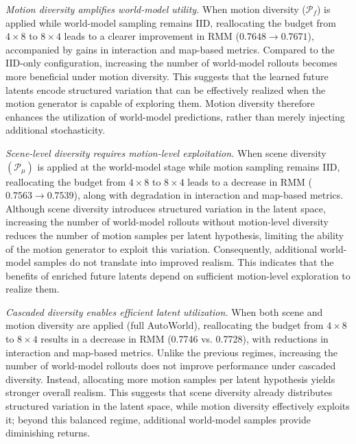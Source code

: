 \documentclass[runningheads]{llncs}
\begin{document}
\textit{Motion diversity amplifies world-model utility.} When motion diversity ($\mathcal{P}_f$) is applied while world-model sampling remains IID, reallocating the budget from $4 \times 8$ to $8 \times 4$ leads to a clearer improvement in RMM ($0.7648 \rightarrow 0.7671$), accompanied by gains in interaction and map-based metrics. Compared to the IID-only configuration, increasing the number of world-model rollouts becomes more beneficial under motion diversity. This suggests that the learned future latents encode structured variation that can be effectively realized when the motion generator is capable of exploring them. Motion diversity therefore enhances the utilization of world-model predictions, rather than merely injecting additional stochasticity.

\textit{Scene-level diversity requires motion-level exploitation.} When scene diversity $\left(\mathcal{P}_\mu\right)$ is applied at the world-model stage while motion sampling remains IID, reallocating the budget from $4 \times 8$ to $8 \times 4$ leads to a decrease in RMM ($0.7563 \rightarrow 0.7539$), along with degradation in interaction and map-based metrics. Although scene diversity introduces structured variation in the latent space, increasing the number of world-model rollouts without motion-level diversity reduces the number of motion samples per latent hypothesis, limiting the ability of the motion generator to exploit this variation. Consequently, additional world-model samples do not translate into improved realism. This indicates that the benefits of enriched future latents depend on sufficient motion-level exploration to realize them.



\textit{Cascaded diversity enables efficient latent utilization.} When both scene and motion diversity are applied (full AutoWorld), reallocating the budget from $4 \times 8$ to $8 \times 4$ results in a decrease in RMM (0.7746 vs. 0.7728), with reductions in interaction and map-based metrics. Unlike the previous regimes, increasing the number of world-model rollouts does not improve performance under cascaded diversity. Instead, allocating more motion samples per latent hypothesis yields stronger overall realism. This suggests that scene diversity already distributes structured variation in the latent space, while motion diversity effectively exploits it; beyond this balanced regime, additional world-model samples provide diminishing returns.
\end{document}
